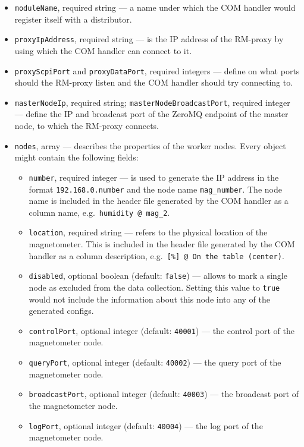 \begin{itemize}
	\item \texttt{moduleName}, required string --- a name under which the COM handler would register itself with a distributor.
	\item \texttt{proxyIpAddress}, required string --- is the IP address of the RM-proxy by using which the COM handler can connect to it.
	\item \texttt{proxyScpiPort} and \texttt{proxyDataPort}, required integers --- define on what ports should the RM-proxy listen and the COM handler should try connecting to.
	\item \texttt{masterNodeIp}, required string; \texttt{masterNodeBroadcastPort}, required integer --- define the IP and broadcast port of the ZeroMQ endpoint of the master node, to which the RM-proxy connects.
	\item{
		\texttt{nodes}, array --- describes the properties of the worker nodes. Every object might contain the following fields:
		\begin{itemize}
			\item \texttt{number}, required integer --- is used to generate the IP address in the format \texttt{192.168.0.number} and the node name \texttt{mag\_number}. The node name is included in the header file generated by the COM handler as a column name, e.g.\ \texttt{humidity @ mag\_2}.
			\item \texttt{location}, required string --- refers to the physical location of the magnetometer. This is included in the header file generated by the COM handler as a column description, e.g.\ \texttt{[\%] @ On the table (center)}.
			\item \texttt{disabled}, optional boolean (default: \texttt{false}) --- allows to mark a single node as excluded from the data collection. Setting this value to \texttt{true} would not include the information about this node into any of the generated configs.
			\item \texttt{controlPort}, optional integer (default: \texttt{40001}) --- the control port of the magnetometer node.
			\item \texttt{queryPort}, optional integer (default: \texttt{40002}) --- the query port of the magnetometer node.
			\item \texttt{broadcastPort}, optional integer (default: \texttt{40003}) --- the broadcast port of the magnetometer node.
			\item \texttt{logPort}, optional integer (default: \texttt{40004}) --- the log port of the magnetometer node.
		\end{itemize}
	}
\end{itemize}

